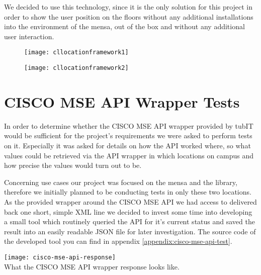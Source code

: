We decided to use this technology, since it is the only solution for this project in order to show the user position on the floors without any additional installations into the environment of the mensa, out of the box and without any additional user interaction.

\begin{figure}
\centering
\begin{minipage}{.5\textwidth}
  \centering
  \texttt{[image: cllocationframework1]}
  \label{fig:cllocationframework1}
\end{minipage}%
\begin{minipage}{.5\textwidth}
  \centering
  \texttt{[image: cllocationframework2]}
  \label{fig:cllocationframework2}
\end{minipage}
\end{figure}


\vspace{0.5cm}

\section{CISCO MSE API Wrapper Tests}

In order to determine whether the CISCO MSE API wrapper provided by tubIT would be sufficient for the project's requirements we were asked to perform tests on it. Especially it was asked for details on how the API worked where, so what values could be retrieved via the API wrapper in which locations on campus and how precise the values would turn out to be.

Concerning use cases our project was focused on the mensa and the library, therefore we initially planned to be conducting tests in only these two locations. As the provided wrapper around the CISCO MSE API we had access to delivered back one short, simple XML line we decided to invest some time into developing a small tool which routinely queried the API for it's current status and saved the result into an easily readable JSON file for later investigation. The source code of the developed tool you can find in appendix \ref{appendix:cisco-mse-api-test}.

\begin{center}
    \texttt{[image: cisco-mse-api-response]}\\
    What the CISCO MSE API wrapper response looks like.
\end{center}


